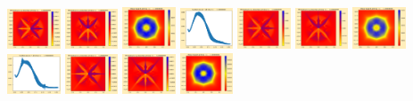 \documentclass[11pt]{article}
\begin{document}
\includegraphics[width=0.11875\textwidth]{frame0010fig2.png}
\includegraphics[width=0.11875\textwidth]{frame0010fig3.png}
\includegraphics[width=0.11875\textwidth]{frame0011fig0.png}
\includegraphics[width=0.11875\textwidth]{frame0011fig1.png}
\includegraphics[width=0.11875\textwidth]{frame0011fig2.png}
\includegraphics[width=0.11875\textwidth]{frame0011fig3.png}
\vskip 10pt 
\includegraphics[width=0.11875\textwidth]{frame0012fig0.png}
\includegraphics[width=0.11875\textwidth]{frame0012fig1.png}
\includegraphics[width=0.11875\textwidth]{frame0012fig2.png}
\includegraphics[width=0.11875\textwidth]{frame0012fig3.png}
\includegraphics[width=0.11875\textwidth]{frame0013fig0.png}
\end{document}
